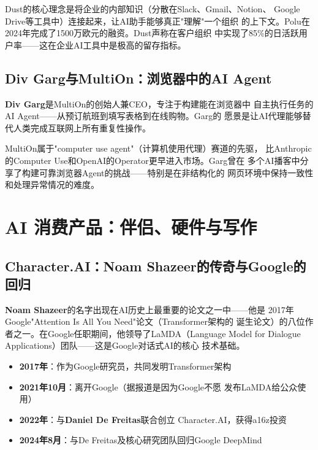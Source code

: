 Dust的核心理念是将企业的内部知识（分散在Slack、Gmail、Notion、
Google Drive等工具中）连接起来，让AI助手能够真正"理解"一个组织
的上下文。Polu在2024年完成了1500万欧元的融资。Dust声称在客户组织
中实现了85\%的日活跃用户率——这在企业AI工具中是极高的留存指标。

\subsection{Div Garg与MultiOn：浏览器中的AI Agent}
\label{subsec:founders-multion}

\textbf{Div Garg}是MultiOn的创始人兼CEO，专注于构建能在浏览器中
自主执行任务的AI Agent——从预订航班到填写表格到在线购物。Garg的
愿景是让AI代理能够替代人类完成互联网上所有重复性操作。

MultiOn属于"computer use agent"（计算机使用代理）赛道的先驱，
比Anthropic的Computer Use和OpenAI的Operator更早进入市场。Garg曾在
多个AI播客中分享了构建可靠浏览器Agent的挑战——特别是在非结构化的
网页环境中保持一致性和处理异常情况的难度。


\section{AI 消费产品：伴侣、硬件与写作}
\label{sec:founders-consumer}

\subsection{Character.AI：Noam Shazeer的传奇与Google的回归}
\label{subsec:founders-characterai}

\textbf{Noam Shazeer}的名字出现在AI历史上最重要的论文之一中——他是
2017年Google"Attention Is All You Need"论文（Transformer架构的
诞生论文）的八位作者之一。在Google任职期间，他领导了LaMDA（Language
Model for Dialogue Applications）团队——这是Google对话式AI的核心
技术基础。

\begin{keybox}
\begin{itemize}
  \item \textbf{2017年}：作为Google研究员，共同发明Transformer架构
  \item \textbf{2021年10月}：离开Google（据报道是因为Google不愿
    发布LaMDA给公众使用）
  \item \textbf{2022年}：与\textbf{Daniel De Freitas}联合创立
    Character.AI，获得a16z投资
  \item \textbf{2024年8月}：与De Freitas及核心研究团队回归Google
    DeepMind
\end{itemize}
\end{keybox}

